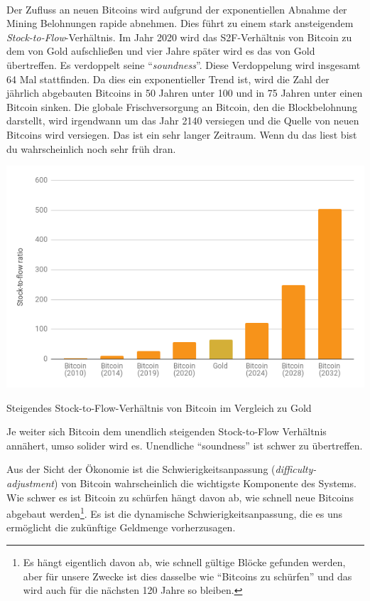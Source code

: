 \paragraph{}
Der Zufluss an neuen Bitcoins wird aufgrund der exponentiellen Abnahme der
Mining Belohnungen rapide abnehmen. Dies führt zu einem stark ansteigendem
\textit{Stock-to-Flow}-Verhältnis. Im Jahr 2020 wird das S2F-Verhältnis von Bitcoin
zu dem von Gold aufschließen und vier Jahre später wird es das von Gold übertreffen. Es
verdoppelt seine \enquote{\textit{soundness}}. Diese Verdoppelung wird insgesamt
64 Mal stattfinden. Da dies ein exponentieller Trend ist, wird die Zahl der
jährlich abgebauten Bitcoins in 50 Jahren unter 100 und in 75 Jahren
unter einen Bitcoin sinken. Die globale Frischversorgung an Bitcoin, den die
Blockbelohnung darstellt, wird irgendwann um das Jahr 2140 versiegen und die
Quelle von neuen Bitcoins wird versiegen. Das ist ein sehr langer Zeitraum. Wenn
du das liest bist du wahrscheinlich noch sehr früh dran.

\begin{center}
  \includegraphics[width=\textwidth]{assets/images/soundness-over-time.png}
  \caption{Steigendes Stock-to-Flow-Verhältnis von Bitcoin im Vergleich zu Gold}
  \label{fig:soundness-over-time}
\end{center}

Je weiter sich Bitcoin dem unendlich steigenden Stock-to-Flow Verhältnis
annähert, umso solider wird es. Unendliche \enquote{soundness} ist schwer zu
übertreffen.

Aus der Sicht der Ökonomie ist die Schwierigkeitsanpassung
(\textit{difficulty-adjustment}) von Bitcoin wahrscheinlich die wichtigste
Komponente des Systems. Wie schwer es ist Bitcoin zu schürfen hängt davon ab,
wie schnell neue Bitcoins abgebaut werden\footnote{Es hängt eigentlich davon ab,
wie schnell gültige Blöcke gefunden werden, aber für unsere Zwecke ist dies
dasselbe wie \enquote{Bitcoins zu schürfen} und das wird auch für die nächsten
120 Jahre so bleiben.}. Es ist die dynamische Schwierigkeitsanpassung, die es
uns ermöglicht die zukünftige Geldmenge vorherzusagen.

